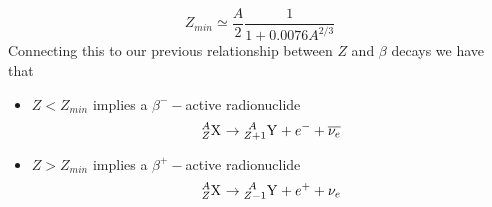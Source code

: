 \documentclass[../qm.tex]{subfiles}
\begin{document}
\begin{equation}
	Z_{min}\simeq\frac{A}{2}\frac{1}{1+0.0076A^{2/3}}
	\label{eq:zmin}
\end{equation}
Connecting this to our previous relationship between $Z$ and $\beta$ decays we have that
\begin{itemize}
\item $Z<Z_{min}$ implies a $\beta^--$active radionuclide
	\begin{equation*}
		\nuc{X}{A}{Z}\to\nuc{Y}{\ A}{Z+1}+e^-+\overline{\nu_e}
	\end{equation*}
\item $Z>Z_{min}$ implies a $\beta^+-$active radionuclide
	\begin{equation*}
		\nuc{X}{A}{Z}\to\nuc{Y}{\ A}{Z-1}+e^++\nu_e
	\end{equation*}
\end{itemize}
\end{document}
